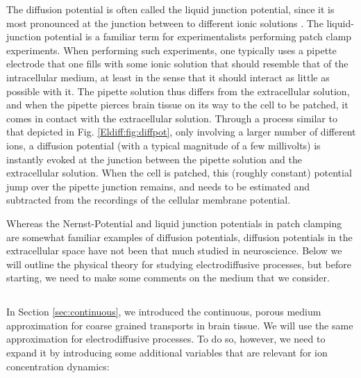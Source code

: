 The diffusion potential is often called the liquid junction potential, since it is most pronounced at the junction between to different ionic solutions \cite{Sokalski2001}. The liquid-junction potential is a familiar term for experimentalists performing patch clamp experiments. When performing such experiments, one typically uses a pipette electrode that one fills with some ionic solution that should resemble that of the intracellular medium, at least in the sense that it should interact as little as possible with it. The pipette solution thus differs from the extracellular solution, and when the pipette pierces brain tissue on its way to the cell to be patched, it comes in contact with the extracellular solution. Through a process similar to that depicted in Fig. \ref{Eldiff:fig:diffpot}, only involving a larger number of different ions, a diffusion potential (with a typical magnitude of a few millivolts) is instantly evoked at the junction between the pipette solution and the extracellular solution. When the cell is patched, this (roughly constant) potential jump over the pipette junction remains, and needs to be estimated and subtracted from the recordings of the cellular membrane potential.

Whereas the Nernst-Potential and liquid junction potentials in patch clamping are somewhat familiar examples of diffusion potentials, diffusion potentials in the extracellular space have not been that much studied in neuroscience. Below we will outline the physical theory for studying electrodiffusive processes, but before starting, we need to make some comments on the medium that we consider. 


\subsection{}
\label{sec:porous}
In Section \ref{sec:continuous}, we introduced the continuous, porous medium approximation for coarse grained transports in brain tissue. We will use the same approximation for electrodiffusive processes. To do so, however, we need to expand it by introducing some additional variables that are relevant for ion concentration dynamics:

